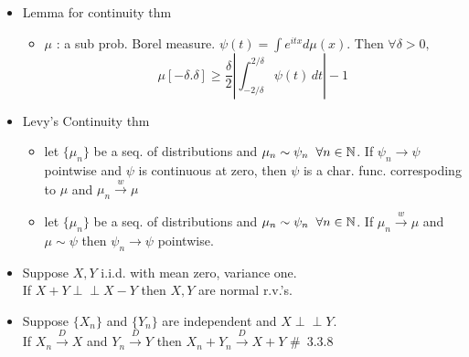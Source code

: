 \documentclass[12pt, A4]{article}
\newcommand{\indep}{\perp \!\!\! \perp}
\begin{document}
\begin{itemize}
	\item Lemma for continuity thm
	\begin{itemize}
		\item $\mu$ : a sub prob. Borel measure. $\psi(t)=\int e^{itx}d\mu(x)$. Then $\forall \delta>0,$ $$\mu{[-\delta. \delta]}\geq \frac{\delta}{2}\left|\int_{-2/\delta}^{2/\delta}\psi(t)\,dt\right|-1$$
	\end{itemize}
	\item Levy's Continuity thm
	\begin{itemize}
		\item let $\{\mu_n\}$ be a seq. of distributions and $\mu_n \sim \psi_n \hspace{0.2cm} \forall n\in \mathbb{N}$.
		\newline If $\psi_n \rightarrow \psi$ pointwise and $\psi$ is continuous at zero, \newline then $\psi$ is a char. func. correspoding to $\mu$ and $\mu_n \xrightarrow{w} \mu$
		\item let $\{\mu_n\}$ be a seq. of distributions and $\mu_n \sim \psi_n \hspace{0.2cm} \forall n\in \mathbb{N}$.
		\newline If $\mu_n\xrightarrow{w} \mu$ and $\mu \sim \psi$ then $\psi_n \rightarrow \psi$ pointwise.
	\end{itemize}
	\item Suppose $X,Y$ i.i.d. with mean zero, variance one. \\If $X+Y\indep X-Y$ then $X,Y$ are normal r.v.'s.
	\item Suppose $\{X_n\}$ and $\{Y_n\}$ are independent and $X\indep Y$. \\If $X_n\xrightarrow{D} X$ and $Y_n\xrightarrow{D}Y$ then $X_n+Y_n\xrightarrow{D}X+Y$ \quad \#\ 3.3.8 
\end{itemize}

\bigskip
\end{document}
